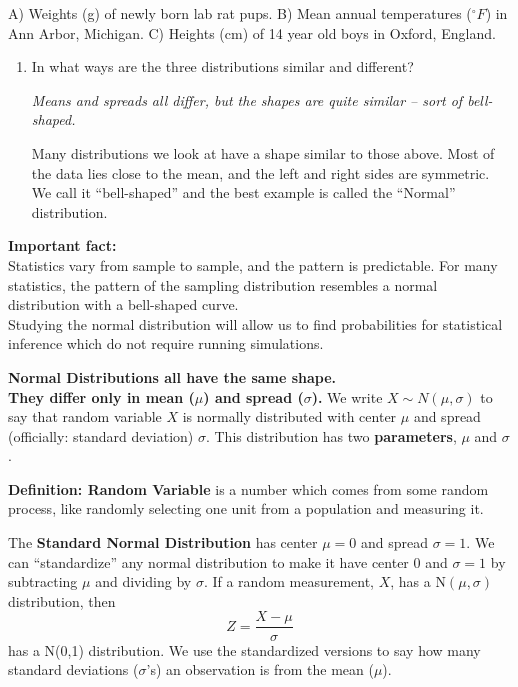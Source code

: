 A) Weights (g) of newly born lab rat pups. 
B) Mean annual temperatures ($^\circ F$) in Ann Arbor, Michigan.
C) Heights (cm) of 14 year old boys in Oxford, England. \vspace{-.1in}


\begin{enumerate}
  \item  In what ways are the three distributions similar and different?
\begin{students}
        \vspace{3cm}        
\end{students}

\begin{key}
{\it Means and spreads all differ, but the shapes are quite
  similar -- sort of bell-shaped. }
\end{key}

  Many distributions we look at have a shape similar to those above.
  Most of the data lies close to the mean, and the left and right
  sides are symmetric.  We call it ``bell-shaped'' and the best example is
  called the ``Normal'' distribution.
\end{enumerate}

{\bf Important fact:}\\
{\sf Statistics vary from sample to sample, and the pattern is
  predictable.  For many statistics, the pattern of the sampling
  distribution resembles a normal distribution with a bell-shaped
  curve. } \\
  Studying the normal distribution will allow us to find
  probabilities for statistical inference which do not require running
  simulations.

 {\bf Normal Distributions all have the same shape.\\
They differ only in mean ($\mu$) and spread ($\sigma$).}  We write $X
\sim N(\mu, \sigma)$ to say that random variable $X$ is normally
distributed with center $\mu$ and spread (officially: standard
deviation) $\sigma$.  This distribution
has two {\bf parameters}, $\mu$ and $\sigma$. 

{\bf Definition:  Random Variable} is a number which comes from some
random process, like randomly selecting one unit from a population and
measuring it.

The  {\bf Standard Normal Distribution} has center $\mu=0$ and spread
$\sigma = 1$.  We can ``standardize'' any normal distribution to make
it have center 0 and $\sigma = 1$ by subtracting $\mu$ and dividing by
$\sigma$. If a random measurement, $X$, has a N$(\mu, \sigma)$
distribution, then $$Z = \frac{X - \mu}\sigma$$ has a N(0,1) distribution. 
We use the standardized versions to say how many standard deviations
($\sigma$'s) an observation is from the mean ($\mu$). 


